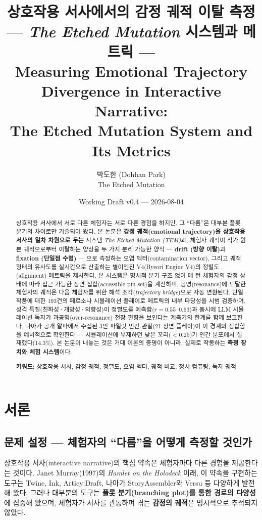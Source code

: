 \documentclass[11pt, a4paper]{article}
\title{%
  상호작용 서사에서의 감정 궤적 이탈 측정\\
  \large --- \textit{The Etched Mutation} 시스템과 메트릭 ---\\[0.8em]
  \normalsize Measuring Emotional Trajectory Divergence in Interactive Narrative:\\
  The Etched Mutation System and Its Metrics
}
\author{박도한 (Dohhan Park)\\ \small The Etched Mutation}
\date{Working Draft v0.4 --- 2026-08-04}
\begin{document}
\maketitle

\begin{abstract}
\noindent 상호작용 서사에서 서로 다른 체험자는 서로 다른 경험을 하지만, 그 ``다름''은 대부분 플롯 분기의 차이로만 기술되어 왔다. 본 논문은 \textbf{감정 궤적(emotional trajectory)을 상호작용 서사의 일차 차원으로 두는} 시스템 \textit{The Etched Mutation (TEM)}과, 체험자 궤적이 작가 원본 궤적으로부터 이탈하는 양상을 두 가지 분리 가능한 양식 --- \textbf{drift (방향 이탈)}과 \textbf{fixation (단일점 수렴)} --- 으로 측정하는 오염 벡터(contamination vector), 그리고 궤적 형태의 유사도를 실시간으로 산출하는 별이엔진 V4(Byeori Engine V4)의 정렬도(alignment) 메트릭을 제시한다. 본 시스템은 명시적 분기 구조 없이 매 턴 체험자의 감정 상태에 따라 접근 가능한 장면 집합(accessible pin set)을 계산하며, 공명(resonance)에 도달한 체험자의 궤적은 다음 체험자를 위한 해석 조각(\textit{trajectory bridge})으로 자동 변환된다. 단일 작품에 대한 193건의 페르소나 시뮬레이션 플레이로 메트릭의 내부 타당성을 시범 검증하며, 성격 특질(친화성·개방성·외향성)이 정렬도를 예측함($r = 0.55$--$0.63$)과 동시에 LLM 시뮬레이션 독자가 과공명(over-resonance) 천장 편향을 보인다는 계측기의 한계를 함께 보고한다. 나아가 공개 알파에서 수집된 3인 파일럿 인간 관찰(21 장면-플레이)이 이 경계와 정합함을 예비적으로 확인한다 --- 시뮬레이션에 부재하던 낮은 꼬리($<0.25$)가 인간 분포에서 실재했다(14.3\%). 본 논문이 내놓는 것은 거대 이론의 증명이 아니라, 실제로 작동하는 \textbf{측정 장치와 체험 시스템}이다.

\medskip
\noindent\textbf{키워드:} 상호작용 서사, 감정 궤적, 정렬도, 오염 벡터, 궤적 비교, 정서 컴퓨팅, 독자 궤적
\end{abstract}

\section{서론}

\subsection{문제 설정 --- 체험자의 ``다름''을 어떻게 측정할 것인가}

상호작용 서사(interactive narrative)의 핵심 약속은 체험자마다 다른 경험을 제공한다는 것이다. Janet Murray(1997)의 \textit{Hamlet on the Holodeck} 이래, 이 약속을 구현하는 도구는 Twine, Ink, Articy:Draft, 나아가 StoryAssembler와 Versu 등 다양하게 발전해 왔다. 그러나 대부분의 도구는 \textbf{플롯 분기(branching plot)를 통한 경로의 다양성}에 집중해 왔으며, 체험자가 서사를 관통하며 겪는 \textbf{감정의 궤적}은 명시적으로 추적되지 않았다.
\end{document}
